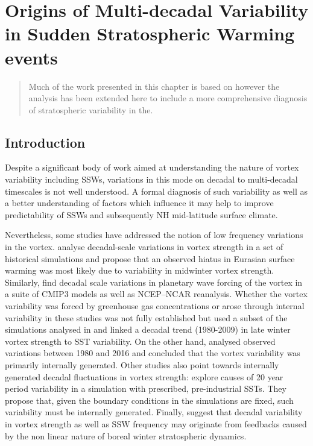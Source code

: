 \chapter{Origins of Multi-decadal Variability in Sudden Stratospheric Warming events}
\label{cha:models}
\begin{quotation}
  Much of the work presented in this chapter is based on \cite{dimdore-milesOrigins2020} however the analysis has been extended here to include a more comprehensive diagnosis of stratospheric variability in the.
\end{quotation}


\section{Introduction}
\label{sec:origins_introduction}
Despite a significant body of work aimed at understanding the nature of vortex variability including SSWs, variations in this mode on decadal to multi-decadal timescales is not well understood. A formal diagnosis of such variability as well as a better understanding of factors which influence it may help to improve predictability of SSWs and subsequently NH mid-latitude surface climate.

Nevertheless, some studies have addressed the notion of low frequency variations in the vortex. \cite{Garfinkel2017} analyse decadal-scale variations in vortex strength in a set of historical simulations and propose that an observed hiatus in Eurasian surface warming was most likely due to variability in midwinter vortex strength. Similarly, \cite{cohen2009} find decadal scale variations in planetary wave forcing of the vortex in a suite of CMIP3 models as well as NCEP–NCAR reanalysis. Whether the vortex variability was forced by greenhouse gas concentrations or arose through internal variability in these studies was not fully established but \cite{Garfinkel2015} used a subset of the simulations analysed in \cite{Garfinkel2017} and linked a decadal trend (1980-2009) in late winter vortex strength to SST variability. On the other hand, \cite{Seviour2017} analysed observed variations between 1980 and 2016 and concluded that the vortex variability was primarily internally generated. Other studies also point towards internally generated decadal fluctuations in vortex strength: \cite{Manzini2012} explore causes of 20 year period variability in a simulation with prescribed, pre-industrial SSTs. They propose that, given the boundary conditions in the simulations are fixed, such variability must be internally generated. Finally, \cite{Butchart2000} suggest that decadal variability in vortex strength as well as SSW frequency may originate from feedbacks caused by the non linear nature of boreal winter stratospheric dynamics.


